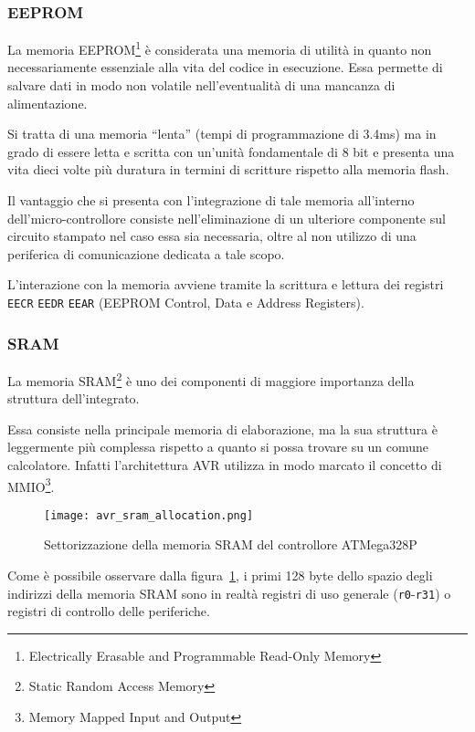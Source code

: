 \subsubsection{EEPROM}

La memoria EEPROM\footnote{Electrically Erasable and Programmable Read-Only Memory} è considerata una memoria di utilità in quanto non necessariamente essenziale alla vita del codice in esecuzione. Essa permette di salvare dati in modo non volatile nell'eventualità di una mancanza di alimentazione.

Si tratta di una memoria ``lenta'' (tempi di programmazione di 3.4ms\cite[tab 8-1]{avr:m328p}) ma in grado di essere letta e scritta con un'unità fondamentale di 8 bit\cite[sec 8.4]{avr:m328p} e presenta una vita dieci volte più duratura in termini di scritture rispetto alla memoria flash.

Il vantaggio che si presenta con l'integrazione di tale memoria all'interno dell'micro-controllore consiste nell'eliminazione di un ulteriore componente sul circuito stampato nel caso essa sia necessaria, oltre al non utilizzo di una periferica di comunicazione dedicata a tale scopo.

L'interazione con la memoria avviene tramite la scrittura e lettura dei registri \texttt{EECR} \texttt{EEDR} \texttt{EEAR} (EEPROM Control, Data e Address Registers)\cite[34]{avr:m328p}.

\subsubsection{SRAM}
La memoria SRAM\footnote{Static Random Access Memory} è uno dei componenti di maggiore importanza della struttura dell'integrato.

Essa consiste nella principale memoria di elaborazione, ma la sua struttura è leggermente più complessa rispetto a quanto si possa trovare su un comune calcolatore.
Infatti l'architettura AVR utilizza in modo marcato il concetto di MMIO\footnote{Memory Mapped Input and Output}.

\begin{figure}[b]
    \centering
    \texttt{[image: avr\_sram\_allocation.png]}
    \caption[Immagine ottenuta dal documento~\cite{avr:m328p}, fig. 8-3]{Settorizzazione della memoria SRAM del controllore ATMega328P\cite[fig 8-3]{avr:m328p}}\label{fig:avr-sram-alloc}
\end{figure}

Come è possibile osservare dalla figura~\ref{fig:avr-sram-alloc}, i primi 128 byte dello spazio degli indirizzi della memoria SRAM sono in realtà registri di uso generale (\texttt{r0}-\texttt{r31}) o registri di controllo delle periferiche.

